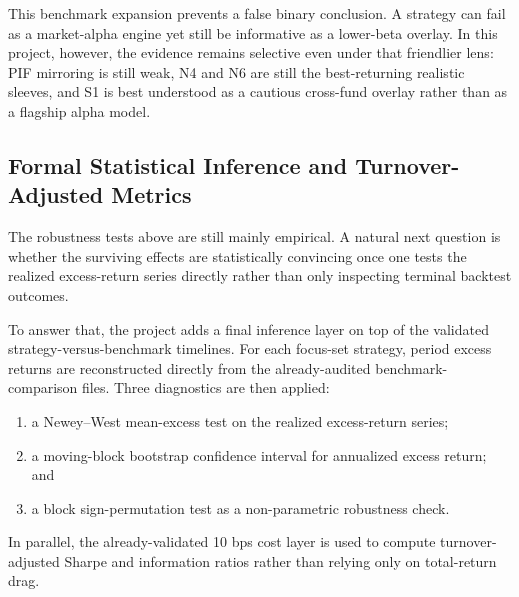 \documentclass[conference]{IEEEtran}
\begin{document}
This benchmark expansion prevents a false binary conclusion. A strategy can fail as a market-alpha engine yet still be informative as a lower-beta overlay. In this project, however, the evidence remains selective even under that friendlier lens: PIF mirroring is still weak, N4 and N6 are still the best-returning realistic sleeves, and S1 is best understood as a cautious cross-fund overlay rather than as a flagship alpha model.

\subsection{Formal Statistical Inference and Turnover-Adjusted Metrics}

The robustness tests above are still mainly empirical. A natural next question is whether the surviving effects are statistically convincing once one tests the realized excess-return series directly rather than only inspecting terminal backtest outcomes.

To answer that, the project adds a final inference layer on top of the validated strategy-versus-benchmark timelines. For each focus-set strategy, period excess returns are reconstructed directly from the already-audited benchmark-comparison files. Three diagnostics are then applied:
\begin{enumerate}[leftmargin=1.4em]
    \item a Newey--West mean-excess test on the realized excess-return series;
    \item a moving-block bootstrap confidence interval for annualized excess return; and
    \item a block sign-permutation test as a non-parametric robustness check.
\end{enumerate}

In parallel, the already-validated 10 bps cost layer is used to compute turnover-adjusted Sharpe and information ratios rather than relying only on total-return drag.

\begin{table}[!t]
\caption{Formal Inference and Turnover-Adjusted Metrics for the Focus Set}
\label{tab:phase3-inference}
\centering
\footnotesize
\renewcommand{\arraystretch}{1.08}
\setlength{\tabcolsep}{3pt}
\end{table}
\end{document}
